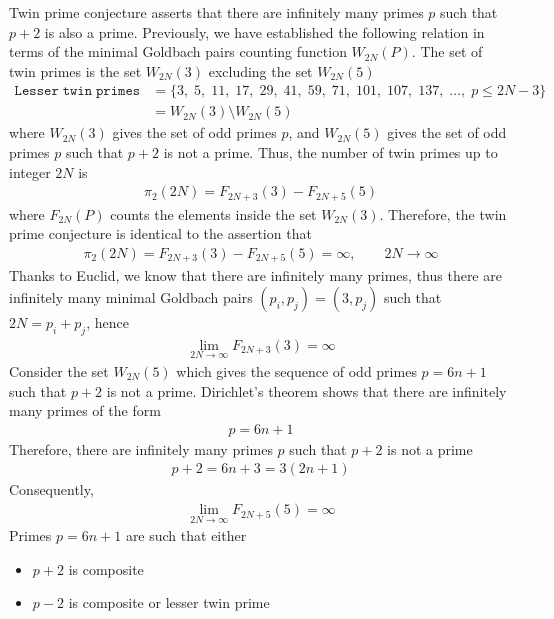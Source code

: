 ﻿Twin prime conjecture asserts that there are infinitely many primes $p$ such that $p+2$ is also a prime.
Previously, we have established the following relation in terms of the minimal Goldbach pairs counting function
$W_{2N}(P)$.
The set of twin primes is the set $W_{2N}(3)$ excluding the set $W_{2N}(5)$
\begin{align*}
    \mathtt{Lesser \; twin \; primes} &= \{ 3, \; 5, \; 11, \; 17, \; 29, \; 41, \; 59, \; 71, \; 101, \; 107, \; 137, \; \dots, \;  p \leq 2N - 3 \} \\
    &= W_{2N}(3) \setminus W_{2N}(5)
\end{align*}
where $W_{2N}(3)$ gives the set of odd primes $p$, and $W_{2N}(5)$ gives the set of odd primes $p$ such that $p+2$
is not a prime.
Thus, the number of twin primes up to integer $2N$ is
\begin{align*}
    \pi_2 (2N) = F_{2N+3}(3) - F_{2N+5}(5)
\end{align*}
where $F_{2N}(P)$ counts the elements inside the set $W_{2N}(3)$.
Therefore, the twin prime conjecture is identical to the assertion that
\begin{align*}
    \pi_2 (2N) = F_{2N+3}(3) - F_{2N+5}(5) = \infty, \quad \quad 2N\to\infty
\end{align*}
Thanks to Euclid, we know that there are infinitely many primes, thus
there are infinitely many minimal Goldbach pairs $(p_i, p_j) = (3, p_j)$ such that $2N=p_i+p_j$,
hence
\begin{align*}
    \lim_{2N\to\infty} F_{2N+3}(3) = \infty
\end{align*}
Consider the set $W_{2N}(5)$ which gives the sequence of odd primes $p=6n+1$ such that $p+2$ is not a prime.
Dirichlet's theorem shows that there are infinitely many primes of the form
\begin{align*}
    p = 6n+1
\end{align*}
Therefore, there are infinitely many primes $p$ such that $p+2$ is not a prime
\begin{align*}
    p+2 = 6n+3 = 3(2n+1)
\end{align*}
Consequently,
\begin{align*}
    \lim_{2N\to\infty} F_{2N+5}(5) = \infty
\end{align*}
Primes $p=6n+1$ are such that either
\begin{itemize}
    \item $p+2$ is composite
    \item $p-2$ is composite or lesser twin prime
\end{itemize}
